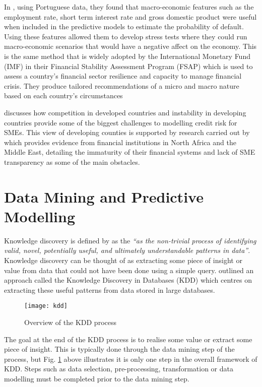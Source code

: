 In \cite{antunes_estimating_2005}, using Portuguese data, they found that macro-economic features such as the employment rate, short term interest rate and gross domestic product were useful when included in the predictive models to estimate the probability of default. Using these features allowed them to develop stress tests where they could run macro-economic scenarios that would have a negative affect on the economy. This is the same method that is widely adopted by the International Monetary Fund (IMF) in their Financial Stability Assessment Program (FSAP) which is used to assess a country's financial sector resilience and capacity to manage financial crisis. They produce tailored recommendations of a micro and macro nature based on each country's circumstances \citep{marston_financial_2001} 

\cite{ardic_small_2011} discusses how competition in developed countries and instability in developing countries provide some of the biggest challenges to modelling credit risk for SMEs. This view of developing counties is supported by research carried out by \cite{rocha_status_2011} which provides evidence from financial institutions in North Africa and the Middle East, detailing the immaturity of their financial systems and lack of SME transparency as some of the main obstacles. 


\section{Data Mining and Predictive Modelling}\label{sec:dataMining}
Knowledge discovery is defined by \cite{frawley_knowledge_1992} as the \textit{``as the non-trivial process of identifying valid, novel, potentially useful, and ultimately understandable patterns in data''}. Knowledge discovery can be thought of as extracting some piece of insight or value from data that could not have been done using a simple query. \cite{fayyad_knowledge_1996} outlined an approach called the Knowledge Discovery in Databases (KDD) which centres on extracting these useful patterns from data stored in large databases.

\begin{figure}[H]
	\texttt{[image: kdd]}
	\caption{Overview of the KDD process  \\
		\cite[Source:][]{fayyad_knowledge_1996}		
	}
	\label{fig:kdd}
\end{figure}

The goal at the end of the KDD process is to realise some value or extract some piece of insight. This is typically done through the data mining step of the process, but Fig. \ref{fig:kdd} above illustrates it is only one step in the overall framework of KDD. Steps such as data selection, pre-processing, transformation or data modelling must be completed prior to the data mining step. 


